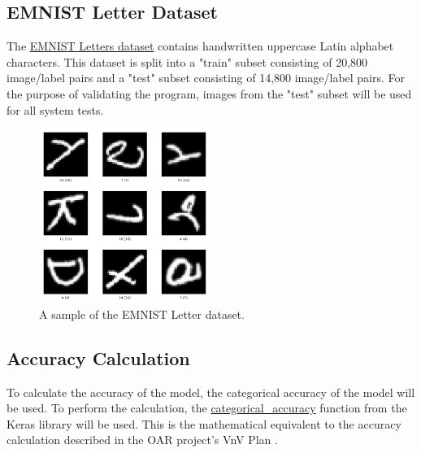 \documentclass[12pt, titlepage]{article}
\begin{document}
\subsection{EMNIST Letter Dataset}
\label{sec:EMNISTLetters}

The \href{https://www.tensorflow.org/datasets/catalog/emnist#emnistletters}{EMNIST Letters dataset} contains handwritten uppercase Latin alphabet
characters. This dataset is split into a "train" subset consisting of 20,800
image/label pairs and a "test" subset consisting of 14,800 image/label pairs.
For the purpose of validating the \progname{} program, images from the "test"
subset will be used for all system tests.

\begin{figure}[H]
\centering
\includegraphics[width=0.5\textwidth]{emnist_letters.png}
\caption{A sample of the EMNIST Letter dataset.}
\label{FigUH}
\end{figure}

\subsection{Accuracy Calculation}
\label{sec:AccuracyCalculation}
To calculate the accuracy of the model, the categorical accuracy of the
model will be used. To perform the calculation, the \href{https://github.com/keras-team/keras/blob/c2e36f369b411ad1d0a40ac096fe35f73b9dffd3/keras/metrics.py}{categorical\_accuracy} function
from the Keras library will be used. This is the mathematical equivalent to the
accuracy calculation described in the OAR project's VnV Plan \citep{OARVnVPlan}.




\end{document}
